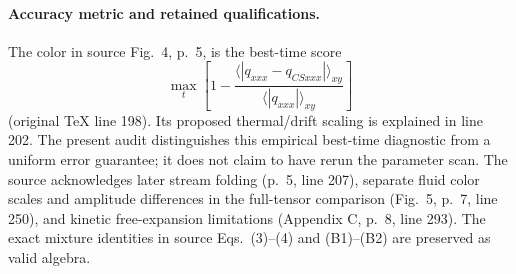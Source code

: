 \paragraph{Accuracy metric and retained qualifications.}
The color in source Fig.~4, p.~5, is the best-time score
\[
 \max_t\left[
 1-\frac{\langle|q_{xxx}-q_{CSxxx}|\rangle_{xy}}
 {\langle|q_{xxx}|\rangle_{xy}}
 \right]
\]
(original TeX line 198). Its proposed thermal/drift scaling is explained in
line 202. The present audit distinguishes this empirical best-time diagnostic
from a uniform error guarantee; it does not claim to have rerun the parameter
scan. The source acknowledges later stream folding (p.~5, line 207), separate
fluid color scales and amplitude differences in the full-tensor comparison
(Fig.~5, p.~7, line 250), and kinetic free-expansion limitations
(Appendix C, p.~8, line 293). The exact mixture identities in source
Eqs.~(3)--(4) and (B1)--(B2) are preserved as valid algebra.
